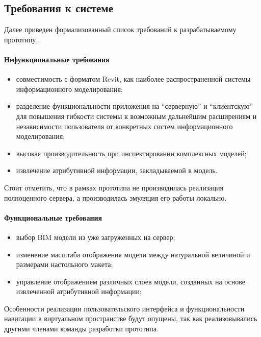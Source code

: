 ﻿\subsection{Требования к системе}

Далее приведен формализованный список требований к разрабатываемому прототипу.

\paragraph{Нефункциональные требования}
\begin{itemize}
    \item совместимость с форматом Revit,
    как наиболее распространенной системы информационного моделирования;
    \item разделение функциональности приложения на ``серверную'' и ``клиентскую''
    для повышения гибкости системы к возможным дальнейшим расширениям и
    независимости пользователя от конкретных систем информационного моделирования;
    \item высокая производительность при инспектировании комплексных моделей;
    \item извлечение атрибутивной информации,
    закладываемой в модель.
\end{itemize}

Стоит отметить, что в рамках прототипа не производилась реализация полноценного сервера,
а производилась эмуляция его работы локально.

\paragraph{Функциональные требования}
\begin{itemize}
    \item выбор BIM модели из уже загруженных на сервер;
    \item изменение масштаба отображения модели
    между натуральной величиной и размерами настольного макета;
    \item управление отображением различных слоев модели,
    созданных на основе извлеченной атрибутивной информации;
\end{itemize}

Особенности реализации пользовательского интерфейса и
функциональности навигации в виртуальном пространстве будут опущены,
так как реализовывались другими членами команды разработки прототипа.